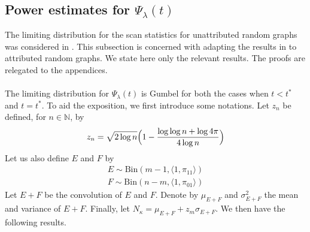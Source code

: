 \documentclass[final]{IEEEtran}
\theoremstyle{definition}
\begin{document}
\subsection{Power estimates for $\Psi_{\lambda}(t)$}
The limiting distribution for the scan statistics for unattributed
random graphs was considered in
\cite{rukhin:_limit_distr_graph_scan_statis}. This subsection is
concerned with adapting the results in
\cite{rukhin:_limit_distr_graph_scan_statis} to attributed random
graphs. We state here only the relevant results. The proofs are
relegated to the appendices. \\ \\
\noindent
The limiting distribution for $\Psi_{\lambda}(t)$ is Gumbel for both
the cases when $t < t^{*}$ and $t = t^{*}$. To aid the exposition,
 we first introduce some notations. Let $z_n$ be defined, for $n \in \mathbb{N}$, by
\begin{equation}
  \label{eq:20}
   z_n = \sqrt{2
      \log{n}}\Bigl(1 - \frac{\log{\log{n}} + \log{4 \pi}}{4
      \log{n}}\Bigr)
\end{equation}
Let us also define $E$ and $F$ by
\begin{gather*}
  E \sim \mathrm{Bin}(m-1, \langle 1, \pi_{11} \rangle) \\ F \sim \mathrm{Bin}(n-m,
  \langle 1, \pi_{01} \rangle)
\end{gather*}%
Let $E + F$ be the convolution of $E$ and $F$. Denote by $\mu_{E+F}$ and
$\sigma_{E+F}^{2}$ the mean and variance of $E + F$. Finally, let
$N_{\kappa} = \mu_{E + F} + z_m \sigma_{E + F}$. We then have the
following results.
\end{document}
